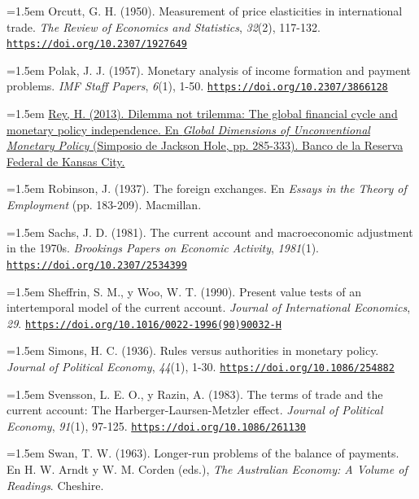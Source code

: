 \documentclass[10pt,a4paper]{article}
\begin{document}
\noindent\hangindent=1.5em Orcutt, G. H. (1950). Measurement of price elasticities in international trade. \textit{The Review of Economics and Statistics}, \textit{32}(2), 117-132. \href{https://doi.org/10.2307/1927649}{\nolinkurl{https://doi.org/10.2307/1927649}}

\noindent\hangindent=1.5em Polak, J. J. (1957). Monetary analysis of income formation and payment problems. \textit{IMF Staff Papers}, \textit{6}(1), 1-50. \href{https://doi.org/10.2307/3866128}{\nolinkurl{https://doi.org/10.2307/3866128}}

\noindent\hangindent=1.5em \href{https://www.kansascityfed.org/Jackson\%20Hole/documents/4575/2013Rey.pdf}{Rey, H. (2013). Dilemma not trilemma: The global financial cycle and monetary policy independence. En \textit{Global Dimensions of Unconventional Monetary Policy} (Simposio de Jackson Hole, pp. 285-333). Banco de la Reserva Federal de Kansas City.}

\noindent\hangindent=1.5em Robinson, J. (1937). The foreign exchanges. En \textit{Essays in the Theory of Employment} (pp. 183-209). Macmillan.

\noindent\hangindent=1.5em Sachs, J. D. (1981). The current account and macroeconomic adjustment in the 1970s. \textit{Brookings Papers on Economic Activity}, \textit{1981}(1). \href{https://doi.org/10.2307/2534399}{\nolinkurl{https://doi.org/10.2307/2534399}}

\noindent\hangindent=1.5em Sheffrin, S. M., y Woo, W. T. (1990). Present value tests of an intertemporal model of the current account. \textit{Journal of International Economics}, \textit{29}. \href{https://doi.org/10.1016/0022-1996(90)90032-H}{\nolinkurl{https://doi.org/10.1016/0022-1996(90)90032-H}}

\noindent\hangindent=1.5em Simons, H. C. (1936). Rules versus authorities in monetary policy. \textit{Journal of Political Economy}, \textit{44}(1), 1-30. \href{https://doi.org/10.1086/254882}{\nolinkurl{https://doi.org/10.1086/254882}}

\noindent\hangindent=1.5em Svensson, L. E. O., y Razin, A. (1983). The terms of trade and the current account: The Harberger-Laursen-Metzler effect. \textit{Journal of Political Economy}, \textit{91}(1), 97-125. \href{https://doi.org/10.1086/261130}{\nolinkurl{https://doi.org/10.1086/261130}}

\noindent\hangindent=1.5em Swan, T. W. (1963). Longer-run problems of the balance of payments. En H. W. Arndt y W. M. Corden (eds.), \textit{The Australian Economy: A Volume of Readings}. Cheshire.
\end{document}
